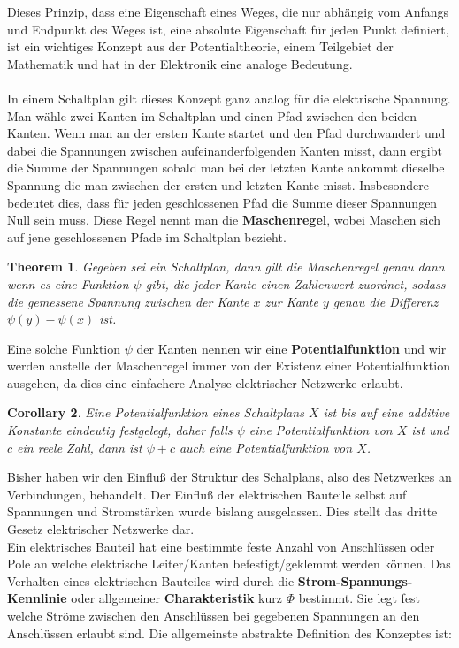 \documentclass[11pt,a4paper,leqno]{report}
\newtheorem{theorem}{Theorem}[chapter]
\newtheorem{corollary}[theorem]{Corollary}
\numberwithin{equation}{chapter}
\begin{document}
Dieses Prinzip, dass eine Eigenschaft eines Weges, die nur abh\"angig vom Anfangs und Endpunkt des Weges ist, eine absolute Eigenschaft f\"ur jeden Punkt definiert, ist ein wichtiges Konzept aus der Potentialtheorie, einem Teilgebiet der Mathematik und hat in der Elektronik eine analoge Bedeutung.
\\
\\
In einem Schaltplan gilt dieses Konzept ganz analog f\"ur die elektrische Spannung.
Man w\"ahle zwei Kanten im Schaltplan und einen Pfad zwischen den beiden Kanten. Wenn man an der ersten Kante startet und den Pfad durchwandert und dabei die Spannungen zwischen aufeinanderfolgenden Kanten misst, dann ergibt die Summe der Spannungen sobald man bei der letzten Kante ankommt dieselbe Spannung die man zwischen der ersten und letzten Kante misst. Insbesondere bedeutet dies, dass f\"ur jeden geschlossenen Pfad die Summe dieser Spannungen Null sein muss.
Diese Regel nennt man die \textbf{Maschenregel}, wobei Maschen sich auf jene geschlossenen Pfade im Schaltplan bezieht.
\begin{theorem}
	Gegeben sei ein Schaltplan, dann gilt die Maschenregel genau dann wenn es eine Funktion $\psi$ gibt, die jeder Kante einen Zahlenwert zuordnet, sodass die gemessene Spannung zwischen der Kante $x$ zur Kante $y$ genau die Differenz $\psi(y)-\psi(x)$ ist.
\end{theorem}
\noindent
Eine solche Funktion $\psi$ der Kanten nennen wir eine \textbf{Potentialfunktion} und wir werden anstelle der Maschenregel immer von der Existenz einer Potentialfunktion ausgehen, da dies eine einfachere Analyse elektrischer Netzwerke erlaubt.
\begin{corollary}
	Eine Potentialfunktion eines Schaltplans $X$ ist bis auf eine additive Konstante eindeutig festgelegt, daher falls $\psi$ eine Potentialfunktion von $X$ ist und $c$ ein reele Zahl, dann ist $\psi + c$ auch eine Potentialfunktion von $X$.
\end{corollary}
\noindent
Bisher haben wir den Einflu\ss{} der Struktur des Schalplans, also des Netzwerkes an Verbindungen, behandelt. Der Einflu\ss{} der elektrischen Bauteile selbst auf Spannungen und Stromst\"arken wurde bislang ausgelassen. Dies stellt das dritte Gesetz elektrischer Netzwerke dar.\\
Ein elektrisches Bauteil hat eine bestimmte feste Anzahl von Anschl\"ussen oder Pole an welche elektrische Leiter/Kanten befestigt/geklemmt werden k\"onnen. Das Verhalten eines elektrischen Bauteiles wird durch die \textbf{Strom-Spannungs-Kennlinie} oder allgemeiner \textbf{Charakteristik} kurz $\Phi$ bestimmt. Sie legt fest welche Str\"ome zwischen den Anschl\"ussen bei gegebenen Spannungen an den Anschl\"ussen erlaubt sind. Die allgemeinste abstrakte Definition des Konzeptes ist:
\end{document}
